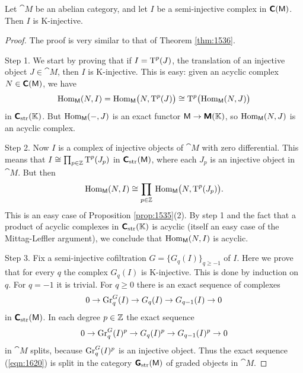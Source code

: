 \begin{thm} \label{thm:1620}
Let $\cat{M}$ be an abelian category, and let $I$ be a 
semi-injective complex in $\boldsymbol{\mathsf{C}}(\operatorname{\mathsf{M}})$. Then $I$ is 
K-injective. 
\end{thm}


\begin{proof}
The proof is very similar to that of Theorem \ref{thm:1536}. 
 
\medskip \noindent
Step 1. We start by proving that if $I = \operatorname{T}^p(J)$, the translation of an 
injective object $J \in \cat{M}$, then $I$ is K-injective. This is easy: 
given an acyclic complex $N \in \boldsymbol{\mathsf{C}}(\operatorname{\mathsf{M}})$, we have 
\[ \operatorname{Hom}_{\operatorname{\mathsf{M}}}(N, I) = 
\operatorname{Hom}_{\operatorname{\mathsf{M}}} \bigl( N, \operatorname{T}^p(J) \bigr) \cong
\operatorname{T}^{p} \bigl( \operatorname{Hom}_{\operatorname{\mathsf{M}}}(N, J) \bigr) \]
in $\boldsymbol{\mathsf{C}}_{\mathrm{str}}(\mathbb{K})$. But 
$\operatorname{Hom}_{\operatorname{\mathsf{M}}}(-, J)$ is an exact functor 
$\operatorname{\mathsf{M}} \to \boldsymbol{\mathsf{M}}(\mathbb{K})$, so $\operatorname{Hom}_{\operatorname{\mathsf{M}}}(N, J)$ is an acyclic 
complex. 

\medskip \noindent
Step 2. Now $I$ is a complex of injective objects of $\cat{M}$ with zero 
differential. This means that 
$I \cong \prod_{p \in \mathbb{Z}} \operatorname{T}^p(J_p)$
in $\boldsymbol{\mathsf{C}}_{\mathrm{str}}(\operatorname{\mathsf{M}})$, where each $J_p$ is an injective object in 
$\cat{M}$. But then 
\[ \operatorname{Hom}_{\operatorname{\mathsf{M}}}(N, I) \cong 
\prod_{p \in \mathbb{Z}} \, \operatorname{Hom}_{\operatorname{\mathsf{M}}} \bigl( N, \operatorname{T}^p(J_p) \bigr) . \]
This is an easy case of Proposition \ref{prop:1535}(2). By step 1 and the fact 
that a product of acyclic complexes in $\boldsymbol{\mathsf{C}}_{\mathrm{str}}(\mathbb{K})$ is acyclic 
(itself an easy case of the Mittag-Leffler argument), we conclude that 
$\operatorname{Hom}_{\operatorname{\mathsf{M}}}(N, I)$ is acyclic. 

\medskip \noindent
Step 3. Fix a semi-injective cofiltration $G = \{ G_q(I) \}_{q \geq -1}$
of $I$. Here we prove that for every $q$ the complex  
$G_q(I)$ is K-injective. This is done by induction on $q$. 
For $q = -1$ it is trivial. For $q \geq 0$ there is an exact sequence of 
complexes 
\begin{equation} \label{eqn:1620}
0 \to \operatorname{Gr}_q^{G}(I) \to G_q(I) \to G_{q - 1}(I) \to 0 
\end{equation}
in $\boldsymbol{\mathsf{C}}_{\mathrm{str}}(\operatorname{\mathsf{M}})$. 
In each degree $p \in \mathbb{Z}$ the exact sequence 
\[ 0 \to \operatorname{Gr}_q^{G}(I)^p \to G_q(I)^p \to G_{q - 1}(I)^p \to 0 \]
in $\cat{M}$ splits, because $\operatorname{Gr}^G_{q}(I)^p$ is an injective 
object. Thus the exact sequence (\ref{eqn:1620}) is split in the category 
$\operatorname{\boldsymbol{\mathsf{G}}}_{\mathrm{str}}(\operatorname{\mathsf{M}})$ of graded objects in $\cat{M}$. 


\end{proof}
